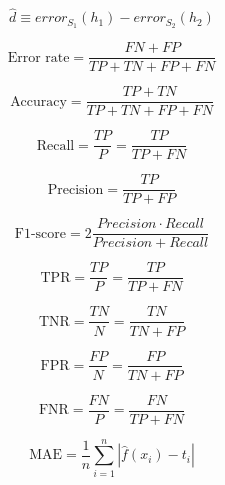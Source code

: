 \documentclass{article}
\begin{document}
\begin{equation}
    \hat{d} \equiv error_{S_1}(h_1) - error_{S_2}(h_2)
\end{equation}

\begin{equation}
    \text{Error rate} = \frac{FN + FP}{TP + TN + FP + FN}
\end{equation}

\begin{equation}
    \text{Accuracy} = \frac{TP + TN}{TP + TN + FP + FN}
\end{equation}

\begin{equation}
    \text{Recall} = \frac{TP}{P} = \frac{TP}{TP + FN}
\end{equation}

\begin{equation}
    \text{Precision} = \frac{TP}{TP + FP}
\end{equation}

\begin{equation}
    \text{F1-score} = 2 \frac{Precision \cdot Recall}{Precision + Recall}
\end{equation}

\begin{equation}
    \text{TPR} = \frac{TP}{P} = \frac{TP}{TP + FN}
\end{equation}

\begin{equation}
    \text{TNR} = \frac{TN}{N} = \frac{TN}{TN + FP}
\end{equation}

\begin{equation}
    \text{FPR} = \frac{FP}{N} = \frac{FP}{TN + FP}
\end{equation}

\begin{equation}
    \text{FNR} = \frac{FN}{P} = \frac{FN}{TP + FN}
\end{equation}

\begin{equation}
    \text{MAE} = \frac{1}{n} \sum_{i=1}^n |\hat{f}(x_i) - t_i|
\end{equation}
\end{document}
